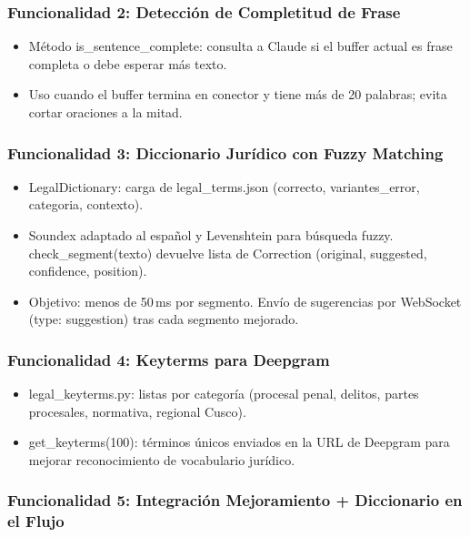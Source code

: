 \documentclass[12pt,a4paper]{report}
\begin{document}
\subsubsection{Funcionalidad 2: Detección de Completitud de Frase}

\begin{itemize}
    \item Método is\_sentence\_complete: consulta a Claude si el buffer actual es frase completa o debe esperar más texto.
    \item Uso cuando el buffer termina en conector y tiene más de 20 palabras; evita cortar oraciones a la mitad.
\end{itemize}

\subsubsection{Funcionalidad 3: Diccionario Jurídico con Fuzzy Matching}

\begin{itemize}
    \item LegalDictionary: carga de legal\_terms.json (correcto, variantes\_error, categoria, contexto).
    \item Soundex adaptado al español y Levenshtein para búsqueda fuzzy. check\_segment(texto) devuelve lista de Correction (original, suggested, confidence, position).
    \item Objetivo: menos de 50\,ms por segmento. Envío de sugerencias por WebSocket (type: suggestion) tras cada segmento mejorado.
\end{itemize}

\subsubsection{Funcionalidad 4: Keyterms para Deepgram}

\begin{itemize}
    \item legal\_keyterms.py: listas por categoría (procesal penal, delitos, partes procesales, normativa, regional Cusco).
    \item get\_keyterms(100): términos únicos enviados en la URL de Deepgram para mejorar reconocimiento de vocabulario jurídico.
\end{itemize}

\subsubsection{Funcionalidad 5: Integración Mejoramiento + Diccionario en el Flujo}
\end{document}
